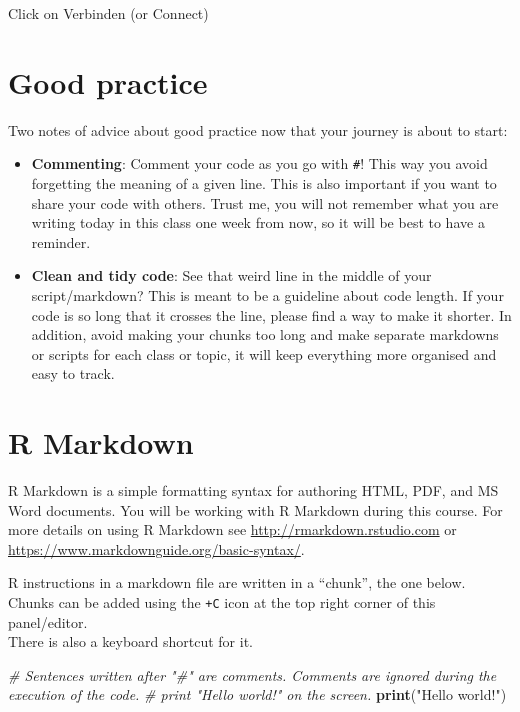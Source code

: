 \documentclass[
]{book}
\newenvironment{Shaded}{\begin{snugshade}}{\end{snugshade}}
\newcommand{\CommentTok}[1]{\textcolor[rgb]{0.56,0.35,0.01}{\textit{#1}}}
\newcommand{\FunctionTok}[1]{\textcolor[rgb]{0.13,0.29,0.53}{\textbf{#1}}}
\newcommand{\NormalTok}[1]{#1}
\newcommand{\StringTok}[1]{\textcolor[rgb]{0.31,0.60,0.02}{#1}}
\providecommand{\tightlist}{%
  \setlength{\itemsep}{0pt}\setlength{\parskip}{0pt}}
\begin{document}
Click on Verbinden (or Connect)

\hypertarget{good-practice}{%
\section*{Good practice}\label{good-practice}}

Two notes of advice about good practice now that your journey is about to start:

\begin{itemize}
\tightlist
\item
  \textbf{Commenting}: Comment your code as you go with \texttt{\#}! This way you avoid forgetting the meaning of a given line. This is also important if you want to share your code with others. Trust me, you will not remember what you are writing today in this class one week from now, so it will be best to have a reminder.\\
\item
  \textbf{Clean and tidy code}: See that weird line in the middle of your script/markdown? This is meant to be a guideline about code length. If your code is so long that it crosses the line, please find a way to make it shorter. In addition, avoid making your chunks too long and make separate markdowns or scripts for each class or topic, it will keep everything more organised and easy to track.
\end{itemize}

\hypertarget{r-markdown}{%
\section*{R Markdown}\label{r-markdown}}

R Markdown is a simple formatting syntax for authoring HTML, PDF, and MS Word documents.
You will be working with R Markdown during this course.
For more details on using R Markdown see \url{http://rmarkdown.rstudio.com} or \url{https://www.markdownguide.org/basic-syntax/}.

R instructions in a markdown file are written in a ``chunk'', the one below.\\
Chunks can be added using the \texttt{+C} icon at the top right corner of this panel/editor.\\
There is also a keyboard shortcut for it.

\begin{Shaded}
\begin{Highlighting}[]
\CommentTok{\# Sentences written after "\#" are comments. Comments are ignored during the execution of the code.}
\CommentTok{\# print "Hello world!" on the screen.}
\FunctionTok{print}\NormalTok{(}\StringTok{"Hello world!"}\NormalTok{)}
\end{Highlighting}
\end{Shaded}
\end{document}
